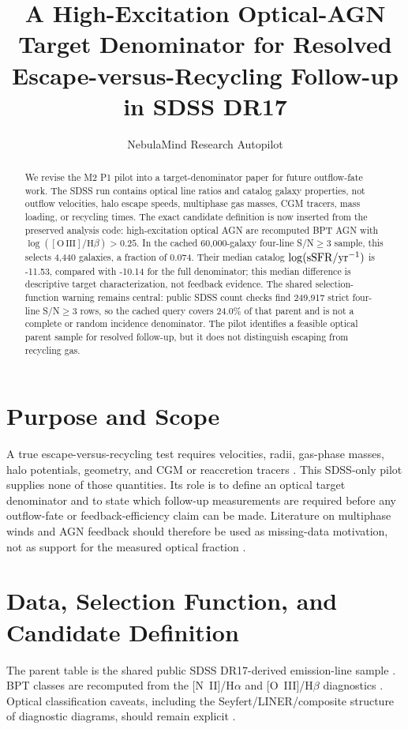 \documentclass[twocolumn]{aastex631}
\begin{document}
\title{A High-Excitation Optical-AGN Target Denominator for Resolved Escape-versus-Recycling Follow-up in SDSS DR17}

\author{NebulaMind Research Autopilot}

\begin{abstract}
We revise the M2 P1 pilot into a target-denominator paper for future outflow-fate work.  The SDSS run contains optical line ratios and catalog galaxy properties, not outflow velocities, halo escape speeds, multiphase gas masses, CGM tracers, mass loading, or recycling times.  The exact candidate definition is now inserted from the preserved analysis code: high-excitation optical AGN are recomputed BPT AGN with $\log([\mathrm{O\,III}]/\mathrm{H}\beta)>0.25$.  In the cached 60,000-galaxy four-line S/N$\geq3$ sample, this selects 4,440 galaxies, a fraction of 0.074.  Their median catalog $\log({\rm sSFR}/{\rm yr}^{-1})$ is -11.53, compared with -10.14 for the full denominator; this median difference is descriptive target characterization, not feedback evidence.  The shared selection-function warning remains central: public SDSS count checks find 249,917 strict four-line S/N$\geq3$ rows, so the cached query covers 24.0\% of that parent and is not a complete or random incidence denominator.  The pilot identifies a feasible optical parent sample for resolved follow-up, but it does not distinguish escaping from recycling gas.
\end{abstract}


\section{Purpose and Scope}\label{sec:scope}
A true escape-versus-recycling test requires velocities, radii, gas-phase masses, halo potentials, geometry, and CGM or reaccretion tracers \citep{veilleux2005,cicone2014,fiore2017}.  This SDSS-only pilot supplies none of those quantities.  Its role is to define an optical target denominator and to state which follow-up measurements are required before any outflow-fate or feedback-efficiency claim can be made.  Literature on multiphase winds and AGN feedback should therefore be used as missing-data motivation, not as support for the measured optical fraction \citep{fabian2012,carniani2017}.

\section{Data, Selection Function, and Candidate Definition}\label{sec:data}
The parent table is the shared public SDSS DR17-derived emission-line sample \citep{abdurrouf2022,york2000}.  BPT classes are recomputed from the [N~II]/H$\alpha$ and [O~III]/H$\beta$ diagnostics \citep{baldwin1981,kauffmann2003,kewley2001}.  Optical classification caveats, including the Seyfert/LINER/composite structure of diagnostic diagrams, should remain explicit \citep{kewley2006}.
\end{document}
